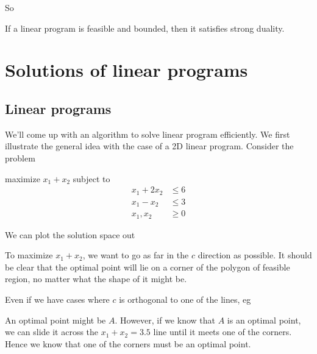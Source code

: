 \documentclass[a4paper]{article}
\begin{document}
So
\begin{thm}[]
  If a linear program is feasible and bounded, then it satisfies strong duality.
\end{thm}

\section{Solutions of linear programs}
\subsection{Linear programs}
We'll come up with an algorithm to solve linear program efficiently. We first illustrate the general idea with the case of a 2D linear program. Consider the problem
\begin{center}
  maximize $x_1 + x_2$ subject to
  \begin{align*}
    x_1 + 2x_2 &\leq 6\\
    x_1 - x_2 &\leq 3\\
    x_1, x_2 &\geq 0
  \end{align*}
\end{center}
We can plot the solution space out
\begin{center}
\end{center}
To maximize $x_1 + x_2$, we want to go as far in the $c$ direction as possible. It should be clear that the optimal point will lie on a corner of the polygon of feasible region, no matter what the shape of it might be.

Even if we have cases where $c$ is orthogonal to one of the lines, eg
\begin{center}
\end{center}
An optimal point might be $A$. However, if we know that $A$ is an optimal point, we can slide it across the $x_1 + x_2 = 3.5$ line until it meets one of the corners. Hence we know that one of the corners must be an optimal point.
\end{document}
